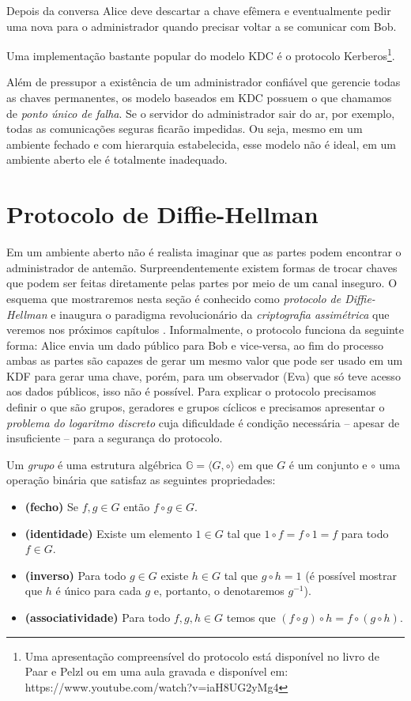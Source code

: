 Depois da conversa Alice deve descartar a chave efêmera e eventualmente pedir uma nova para o administrador quando precisar voltar a se comunicar com Bob.

Uma implementação bastante popular do modelo KDC é o protocolo Kerberos\footnote{Uma apresentação compreensível do protocolo está disponível no livro de Paar e Pelzl \cite{Paar09} ou em uma aula gravada e disponível em: https://www.youtube.com/watch?v=iaH8UG2yMg4}.

Além de pressupor a existência de um administrador confiável que gerencie todas as chaves permanentes, os modelo baseados em KDC possuem o que chamamos de {\em ponto único de falha}.
Se o servidor do administrador sair do ar, por exemplo, todas as comunicações seguras ficarão impedidas.
Ou seja, mesmo em um ambiente fechado e com hierarquia estabelecida, esse modelo não é ideal, em um ambiente aberto ele é totalmente inadequado.

\section{Protocolo de Diffie-Hellman}
\label{sec:diffie-hellman}

Em um ambiente aberto não é realista imaginar que as partes podem encontrar o administrador de antemão.
Surpreendentemente existem formas de trocar chaves que podem ser feitas diretamente pelas partes por meio de um canal inseguro.
O esquema que mostraremos nesta seção é conhecido como {\em protocolo de Diffie-Hellman} e inaugura o paradigma revolucionário da {\em criptografia assimétrica} que veremos nos próximos capítulos \cite{Diffie76}.
Informalmente, o protocolo funciona da seguinte forma: Alice envia um dado público para Bob e vice-versa, ao fim do processo ambas as partes são capazes de gerar um mesmo valor que pode ser usado em um KDF para gerar uma chave, porém, para um observador (Eva) que só teve acesso aos dados públicos, isso não é possível.
Para explicar o protocolo precisamos definir o que são grupos, geradores e grupos cíclicos e precisamos apresentar o {\em problema do logaritmo discreto} cuja dificuldade é condição necessária -- apesar de insuficiente -- para a segurança do protocolo.

Um {\em grupo} é uma estrutura algébrica $\mathbb{G} = \langle G, \circ \rangle$ em que $G$ é um conjunto e $\circ$ uma operação binária que satisfaz as seguintes propriedades:
\begin{itemize}
\item[] {\bf (fecho)} Se $f, g \in G$ então $f \circ g \in G$.
\item[] {\bf (identidade)} Existe um elemento $1 \in G$ tal que $1 \circ f = f \circ 1 = f$ para todo $f \in G$.
\item[] {\bf (inverso)} Para todo $g \in G$ existe $h \in G$ tal que $g \circ h = 1$ (é possível mostrar que $h$ é único para cada $g$ e, portanto, o denotaremos $g^{-1}$).
\item[] {\bf (associatividade)} Para todo $f,g,h \in G$ temos que $(f \circ g) \circ h = f \circ (g \circ h)$.
\end{itemize}


